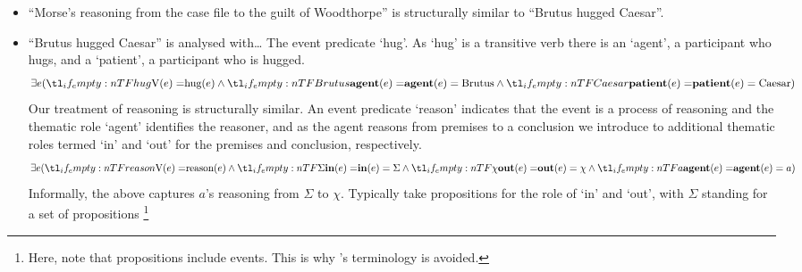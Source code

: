 \documentclass[10pt]{article}
\begin{document}
\begin{itemize}
\item ``Morse's reasoning from the case file to the guilt of Woodthorpe'' is structurally similar to ``Brutus hugged Caesar''.
\item ``Brutus hugged Caesar'' is analysed with\dots
  The event predicate `hug'.
  As `hug' is a transitive verb there is an `agent', a participant who hugs, and a `patient', a participant who is hugged.
  \[
    \exists e(\everb{hug} \land \eagent{Brutus} \land \epatient{Caesar})
  \]
  Our treatment of reasoning is structurally similar.
  An event predicate `reason' indicates that the event is a process of reasoning and the thematic role `agent' identifies the reasoner, and as the agent reasons from premises to a conclusion we introduce to additional thematic roles termed `in' and `out' for the premises and conclusion, respectively.
  \[
    \exists e(\everb{reason} \land \ein{\Sigma} \land \eout{\chi} \land \eagentm{a})
  \]
  Informally, the above captures \(a\)'s reasoning from \(\Sigma\) to \(\chi\).
  {\color{red} Typically} take propositions for the role of `in' and `out', with \(\Sigma\) standing for a set of propositions\nolinebreak
  \footnote{Here, note that propositions include events.
    This is why \citeauthor{Parsons:1990aa}'s terminology is avoided.

}
\end{itemize}
\end{document}
